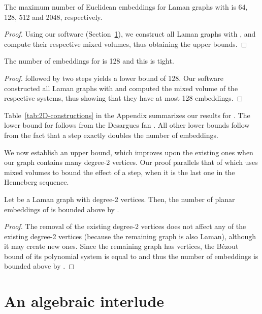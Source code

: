 \documentclass[envcountsame]{llncs}
\begin{document}
\begin{lemma}\label{laman64}
The maximum number of Euclidean embeddings for Laman graphs with  
is 64, 128, 512 and 2048, respectively.
\end{lemma}

\begin{proof}
Using our software (Section~\ref{sec:abid}), we construct all Laman graphs with ,
and compute their  respective mixed volumes, thus obtaining the upper bounds.
\end{proof}

\begin{lemma}
The number of embeddings for  is 128 and this is tight.\end{lemma}
\begin{proof}
   followed by two  steps yields a lower bound of 128.
  Our software constructed all Laman graphs with 
  and computed the mixed volume of the respective systems, thus showing that they
have at most 128 embeddings.\end{proof}
\fi

Table~\ref{tab:2D-constructions} in the Appendix summarizes our results for .
The lower bound for  
follows from  the Desargues fan \cite{BS04}. All other lower bounds follow  from   the fact that a  step exactly doubles the number of embeddings.


We now establish an  upper bound, which improves upon the existing ones when our 
graph  contains many degree-2 vertices.
Our proof parallels that of \cite{ST08} which uses mixed volumes to bound the effect
of a  step, when it is the last one in the Henneberg sequence.

\begin{lemma}\label{Lsparse2}
  Let  be a Laman graph with   degree-2 vertices.
  Then, the number of planar embeddings of  is bounded above by .
\end{lemma}

\begin{proof}
The removal of the existing  degree-2 vertices  does not affect any of the existing degree-2 vertices (because the
  remaining graph  is also Laman), although it may create new ones.
  Since the remaining graph has  vertices, the B\'ezout bound of its
polynomial system is equal to  and thus  the number of
embeddings is bounded above by    .
\end{proof}



\section{An algebraic interlude} \label{sec:abid}
\end{document}
